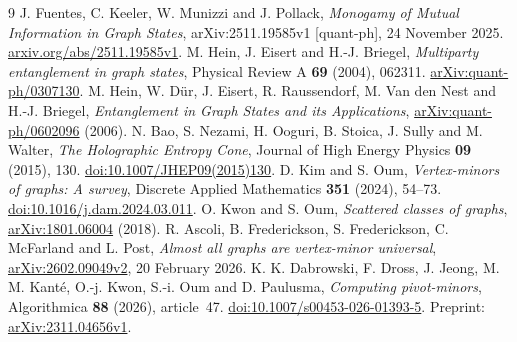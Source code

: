 \documentclass[11pt,letterpaper]{article}
\begin{document}
\begin{thebibliography}{9}
J. Fuentes, C. Keeler, W. Munizzi and J. Pollack,
\emph{Monogamy of Mutual Information in Graph States},
arXiv:2511.19585v1 [quant-ph], 24 November 2025.
\href{https://arxiv.org/abs/2511.19585v1}{arxiv.org/abs/2511.19585v1}.
M. Hein, J. Eisert and H.-J. Briegel,
\emph{Multiparty entanglement in graph states}, Physical Review A \textbf{69} (2004), 062311.
\href{https://arxiv.org/abs/quant-ph/0307130}{arXiv:quant-ph/0307130}.
M. Hein, W. D\"ur, J. Eisert, R. Raussendorf, M. Van den Nest and H.-J. Briegel,
\emph{Entanglement in Graph States and its Applications},
\href{https://arxiv.org/abs/quant-ph/0602096}{arXiv:quant-ph/0602096} (2006).
N. Bao, S. Nezami, H. Ooguri, B. Stoica, J. Sully and M. Walter,
\emph{The Holographic Entropy Cone}, Journal of High Energy Physics \textbf{09} (2015), 130.
\href{https://doi.org/10.1007/JHEP09(2015)130}{doi:10.1007/JHEP09(2015)130}.
D. Kim and S. Oum, \emph{Vertex-minors of graphs: A survey}, Discrete Applied Mathematics \textbf{351} (2024), 54--73.
\href{https://doi.org/10.1016/j.dam.2024.03.011}{doi:10.1016/j.dam.2024.03.011}.
O. Kwon and S. Oum, \emph{Scattered classes of graphs},
\href{https://arxiv.org/abs/1801.06004}{arXiv:1801.06004} (2018).
R. Ascoli, B. Frederickson, S. Frederickson, C. McFarland and L. Post,
\emph{Almost all graphs are vertex-minor universal},
\href{https://arxiv.org/abs/2602.09049v2}{arXiv:2602.09049v2}, 20 February 2026.
K. K. Dabrowski, F. Dross, J. Jeong, M. M. Kant\'e, O.-j. Kwon, S.-i. Oum and D. Paulusma,
\emph{Computing pivot-minors}, Algorithmica \textbf{88} (2026), article~47.
\href{https://doi.org/10.1007/s00453-026-01393-5}{doi:10.1007/s00453-026-01393-5}.
Preprint: \href{https://arxiv.org/abs/2311.04656v1}{arXiv:2311.04656v1}.
\end{thebibliography}
\end{document}

